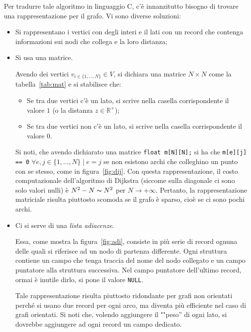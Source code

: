 Per  tradurre tale algoritmo in linguaggio C, c'è innanzitutto bisogno di trovare una rappresentazione per il grafo. Vi sono diverse soluzioni:
\begin{itemize}
	\item
Si rappresentano i vertici con degli interi e il lati con un record che contenga informazioni sui nodi che collega e la loro distanza;
	\item
Si usa una matrice.

Avendo dei vertici $v_{i\in\{1,\dots,N\}}\in V$, si dichiara una matrice $N\times N$ come la tabella~\vref{tab:mat} e si stabilisce che:
	\begin{itemize}
		\item
Se tra due vertici c'è un lato, si scrive nella casella corrispondente il valore $1$ (o la distanza $z\in\mathbb{R^{+}}$);
		\item
Se tra due vertici non c'è un lato, si scrive nella casella corrispondente il valore $0$.
	\end{itemize}
Si noti, che avendo dichiarato una matrice \lstinline!float m[N][N];! si ha che \lstinline!m[e][j] == 0! $\forall e,j\in\{1,\dots,N\}\mid e=j$ se non esistono archi che colleghino un punto con se stesso, come in figura~\ref{fig:dij}. Con questa rappresentazione, il costo computazionale dell'algoritmo di Dijkstra (siccome sulla diagonale ci sono solo valori nulli) è $N^2-N\thicksim N^2$ per $N\to+\infty$. Pertanto, la rappresentazione matriciale risulta piuttosto scomoda se il grafo è sparso, cioè se ci sono pochi archi.
	\item
Ci si serve di una \emph{lista adiacenze}.

Essa, come mostra la figura~\vref{fig:adi}, consiste in più serie di record ognuna delle quali si riferisce ad un nodo di partenza differente. Ogni struttura contiene un campo che tenga traccia del nome del nodo collegato e un campo puntatore alla struttura successiva. Nel campo puntatore dell'ultimo record, ormai è inutile dirlo, si pone il valore \lstinline!NULL!.

Tale rappresentazione risulta piuttosto ridondante per grafi non orientati perché si usano due record per ogni arco, ma diventa più efficiente nel caso di grafi orientati. Si noti che, volendo aggiungere il ""peso'' di ogni lato, si dovrebbe aggiungere ad ogni record un campo dedicato.
\end{itemize}